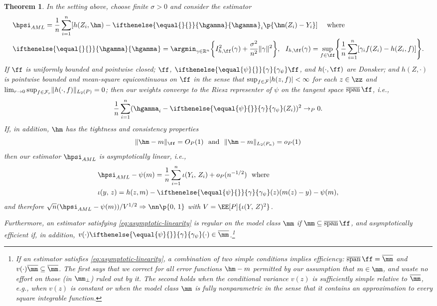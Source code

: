 \documentclass[aos,submission]{imsart}
\theoremstyle{plain}
\newtheorem{theo}[prop]{Theorem}
\theoremstyle{remark}
\DeclareMathOperator*{\cspan}{\overline{span}}
\newcommand{\influence}{\iota}
\newcommand{\riesz}[1][]{\ifthenelse{\equal{#1}{}}{\gamma}{\gamma_{{#1}}}}
\newcommand{\hriesz}[1][]{\ifthenelse{\equal{#1}{}}{\hgamma}{\hgamma_{{#1}}}}
\DeclarePairedDelimiter\abs{\lvert}{\rvert}
\DeclarePairedDelimiter\norm{\lVert}{\rVert}
\DeclarePairedDelimiter\set{\{}{\}}
\newcommand{\R}{\mathbb{R}}
\newcommand{\F}{\mathcal{F}}
\begin{document}
\begin{theo}
\label{theo:simple}
In the setting above, choose finite $\sigma > 0$ and consider the estimator 
\begin{align}
\label{eq:aml}
&\hpsi_{AML} = \frac{1}{n} \sum_{i = 1}^n [ h(Z_i, \hm) - \hriesz_i \p{\hm(Z_i) - Y_i}] \quad \text{ where }\  \\
\label{eq:aml-primal}
&\hriesz = \argmin_{\gamma \in \R^n}\set*{I_{h,\ff}^2(\gamma) + \frac{\sigma^2}{n^2}\norm{\gamma}^2},\ \ I_{h,\ff}(\gamma) = \sup_{f \in \ff}\set*{ \frac{1}{n} \sum_{i = 1}^n [\gamma_i f(Z_i) - h(Z_i,f)]}. 
\end{align}
If $\ff$ is uniformly bounded and pointwise closed; $\ff$, $\riesz[\psi]\ff$, and $h(\cdot,\ff)$ are Donsker;
and $h(Z,\cdot)$ is pointwise bounded and mean-square equicontinuous on $\ff$ in the sense that 
$\sup_{f \in \F} \abs{ h(z,f) } < \infty$ for each $z \in \zz$ and 
$\lim_{r \to 0}\sup_{f \in \F_r}\norm{ h(\cdot,f) }_{L_2(P)} = 0$;
then our weights converge to the Riesz representer of $\psi$ on the tangent space $\cspan \ff$, i.e.,
\begin{equation}
\label{eq:gamma-consistency}
\frac{1}{n}\sum_{i=1}^n (\hgamma_i - \riesz[\psi](Z_i))^2 \to_P 0.
\end{equation}
If, in addition, $\hm$ has the tightness and consistency properties 
\begin{equation}
\label{eq:consistency-properties}
\norm{\hm - m}_{\ff} = O_P(1) \ \text{ and }\ \norm{\hm - m}_{\L{2}{\Pn}} = o_P(1) 
\end{equation}
then our estimator $\hpsi_{AML}$ is asymptotically linear, i.e., 
\begin{equation}
\label{eq:asymptotic-linearity}
\begin{split}
&\hpsi_{AML} - \psi(m) = \frac{1}{n}\sum_{i=1}^n \influence(Y_i, \, Z_i) + o_{P}(n^{-1/2}) \ \text{ where }\\
&\influence(y, \, z) = h(z,m) - \riesz[\psi](z)(m(z) - y) - \psi(m),
\end{split}
\end{equation}
and therefore $\sqrt{n}(\hpsi_{AML} - \psi(m))/V^{1/2} \Rightarrow \nn\p{0, \, 1}$ with $V = \EE[P]{\influence(Y, \, Z)^2}$.


Furthermore, an estimator satisfying \eqref{eq:asymptotic-linearity} is 
regular on the model class $\mm$ if $\mm \subseteq \cspan \ff$,
and asymptotically efficient if, in addition, $v(\cdot) \riesz[\psi](\cdot) \in \overline{\mm}$.\footnote{If an estimator satisfies
\eqref{eq:asymptotic-linearity}, 
a combination of two simple conditions implies efficiency: 
$\cspan \ff = \overline \mm$ and $v(\cdot)\overline{\mm} \subseteq \overline{\mm}$. The first says that
we correct for all error functions $\hm - m$ permitted by our assumption that $m \in \mm$, 
and waste no effort on those (in $\mm_{\perp}$) ruled out by it. The second
holds when the conditional variance $v(z)$ is sufficiently simple relative to $\overline{\mm}$,
e.g., when $v(z)$ is constant or when the model class $\mm$ is fully nonparametric in the sense that it contains an approximation to
every square integrable function.} 
\end{theo}
\end{document}

